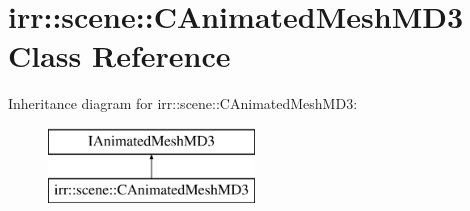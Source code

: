 \hypertarget{classirr_1_1scene_1_1_c_animated_mesh_m_d3}{\section{irr\-:\-:scene\-:\-:C\-Animated\-Mesh\-M\-D3 Class Reference}
\label{classirr_1_1scene_1_1_c_animated_mesh_m_d3}
}
Inheritance diagram for irr\-:\-:scene\-:\-:C\-Animated\-Mesh\-M\-D3\-:\begin{figure}[H]
\begin{center}
\leavevmode
\includegraphics[height=2.000000cm]{classirr_1_1scene_1_1_c_animated_mesh_m_d3}
\end{center}
\end{figure}
